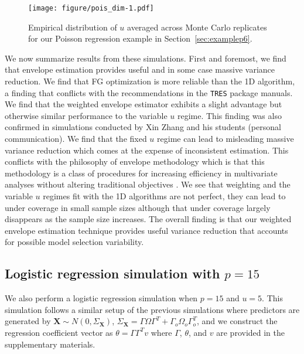 \documentclass{article}\usepackage[]{graphicx}\usepackage[]{color}
\newcommand{\X}{\mathbf{X}}
\begin{document}
\begin{figure}[h!]
	\texttt{[image: figure/pois\_dim-1.pdf]}
	\caption{Empirical distribution of $u$ averaged across Monte Carlo replicates for our Poisson regression example in Section~\ref{sec:examplep6}.}
	\label{fig:poisu}
\end{figure}


We now summarize results from these simulations. First and foremost, we find that envelope estimation provides useful and in some case massive variance reduction. We find that FG optimization is more reliable than the 1D algorithm, a finding that conflicts with the recommendations in the \texttt{TRES} package manuals. We find that the weighted envelope estimator exhibits a slight advantage but otherwise similar performance to the variable $u$ regime. This finding was also confirmed in simulations conducted by Xin Zhang and his students (personal communication). We find that the fixed $u$ regime can lead to misleading massive variance reduction which comes at the expense of inconsistent estimation. This conflicts with the philosophy of envelope methodology which is that this methodology is a class of procedures for increasing efficiency in multivariate analyses without altering traditional objectives \citep[first sentence of page 1]{cook2018introduction}. We see that weighting and the variable $u$ regimes fit with the 1D algorithms are not perfect, they can lead to under coverage in small sample sizes although that under coverage largely disappears as the sample size increases. The overall finding is that our weighted envelope estimation technique provides useful variance reduction that accounts for possible model selection variability.



\subsection{Logistic regression simulation with $p=15$} 
\label{sec:examplep15}

We also perform a logistic regression simulation when $p = 15$ and $u = 5$. This simulation follows a similar setup of the previous simulations where predictors are generated by $\X \sim N(0, \Sigma_{\X})$, $\Sigma_{\X} = \Gamma\Omega\Gamma^T + \Gamma_o\Omega_o\Gamma_o^T$, and we construct the regression coefficient vector as $\theta = \Gamma\Gamma^T v$ where $\Gamma$, $\theta$, and $v$ are provided in the supplementary materials. 
\end{document}
